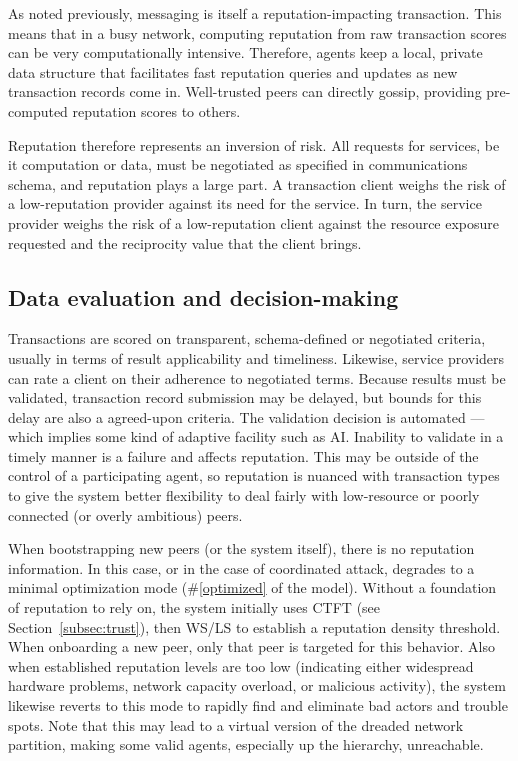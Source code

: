 As noted previously, messaging is itself a reputation-impacting transaction.
This means that in a busy network, computing reputation from raw transaction scores can be very computationally intensive.
Therefore, agents keep a local, private data structure that facilitates fast reputation queries and updates as new transaction records come in.
Well-trusted peers can directly gossip, providing pre-computed reputation scores to others.

Reputation therefore represents an inversion of risk.
All requests for services, be it computation or data, must be negotiated as specified in communications schema, and reputation plays a large part.
A transaction client weighs the risk of a low-reputation provider against its need for the service.
In turn, the service provider weighs the risk of a low-reputation client against the resource exposure requested and the reciprocity value that the client brings.

\begin{ppl}

\end{ppl}


\subsection{Data evaluation and decision-making}\label{subsec:eval}

Transactions are scored on transparent, schema-defined or negotiated criteria, usually in terms of result applicability and timeliness.
Likewise, service providers can rate a client on their adherence to negotiated terms.
Because results must be validated, transaction record submission may be delayed, but bounds for this delay are also a agreed-upon criteria.
The validation decision is automated --- which implies some kind of adaptive facility such as AI. Inability to validate in a timely manner is a failure and affects reputation.
This may be outside of the control of a participating agent, so reputation is nuanced with transaction types to give the system better flexibility to deal fairly with low-resource or poorly connected (or overly ambitious) peers.

When bootstrapping new peers (or the system itself), there is no reputation information.
In this case, or in the case of coordinated attack, \projectName degrades to a minimal optimization mode (\#\ref{optimized} of the model).
Without a foundation of reputation to rely on, the system initially uses CTFT (see Section~\ref{subsec:trust}), then WS/LS to establish a reputation density threshold.
When onboarding a new peer, only that peer is targeted for this behavior.
Also when established reputation levels are too low (indicating either widespread hardware problems, network capacity overload, or malicious activity), the system likewise reverts to this mode to rapidly find and eliminate bad actors and trouble spots.
Note that this may lead to a virtual version of the dreaded network partition, making some valid agents, especially up the hierarchy, unreachable.

